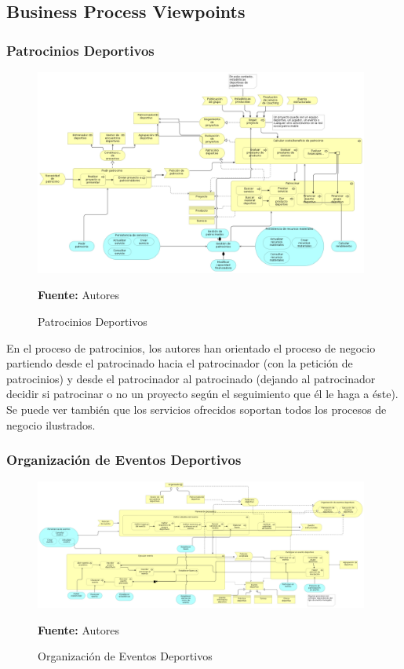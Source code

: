 \subsection{Business Process Viewpoints}

\subsubsection{Patrocinios Deportivos}

\begin{figure}[!htb]
  \begin{center}
    \includegraphics[width=11cm]{./imagenes/business_process/patrociniosdeportivos.png}
    \caption{Patrocinios Deportivos}
    \label{fig:bp_patrocinios_deportivos}
    \textbf{Fuente:}  Autores
  \end{center}
\end{figure}

En el proceso de patrocinios, los autores han orientado el proceso de negocio partiendo desde el patrocinado hacia el patrocinador (con la petición de patrocinios) y desde el patrocinador al patrocinado (dejando al patrocinador decidir si patrocinar o no un proyecto según el seguimiento que él le haga a éste). Se puede ver también que los servicios ofrecidos soportan todos los procesos de negocio ilustrados.

\subsubsection{Organización de Eventos Deportivos}

\begin{figure}[!htb]
  \begin{center}
    \includegraphics[width=11cm]{./imagenes/business_process/organizacioneventosdeportivos.png}
    \caption{Organización de Eventos Deportivos}
    \label{fig:bp_organizacion_eventos_deportivos}
    \textbf{Fuente:}  Autores
  \end{center}
\end{figure}

